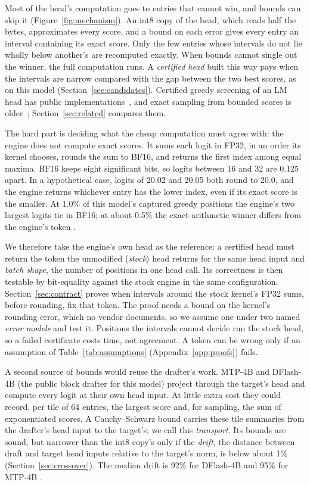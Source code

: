 Most of the head's computation goes to entries that cannot win, and bounds can skip it (Figure~\ref{fig:mechanism}). An int8 copy of the head, which reads half the bytes, approximates every score, and a bound on each error gives every entry an interval containing its exact score. Only the few entries whose intervals do not lie wholly below another's are recomputed exactly. When bounds cannot single out the winner, the full computation runs. A \emph{certified head} built this way pays when the intervals are narrow compared with the gap between the two best scores, as on this model (Section~\ref{sec:candidates}). Certified greedy screening of an LM head has public implementations~\cite{sparkpipehead,dgpphead,lagunaprune,knlphead}, and exact sampling from bounded scores is older~\cite{astar,mussmann2017}; Section~\ref{sec:related} compares them.

The hard part is deciding what the cheap computation must agree with: the engine does not compute exact scores. It sums each logit in FP32, in an order its kernel chooses, rounds the sum to BF16, and returns the first index among equal maxima. BF16 keeps eight significant bits, so logits between 16 and 32 are 0.125 apart. In a hypothetical case, logits of 20.02 and 20.05 both round to 20.0, and the engine returns whichever entry has the lower index, even if its exact score is the smaller. At 1.0\% of this model's captured greedy positions the engine's two largest logits tie in BF16; at about 0.5\% the exact-arithmetic winner differs from the engine's token .

We therefore take the engine's own head as the reference: a certified head must return the token the unmodified (\emph{stock}) head returns for the same head input and \emph{batch shape}, the number of positions in one head call. Its correctness is then testable by bit-equality against the stock engine in the same configuration. Section~\ref{sec:contract} proves when intervals around the stock kernel's FP32 sums, before rounding, fix that token. The proof needs a bound on the kernel's rounding error, which no vendor documents, so we assume one under two named \emph{error models} and test it. Positions the intervals cannot decide run the stock head, so a failed certificate costs time, not agreement. A token can be wrong only if an assumption of Table~\ref{tab:assumptions} (Appendix~\ref{app:proofs}) fails.

A second source of bounds would reuse the drafter's work. MTP-4B and DFlash-4B (the public block drafter for this model) project through the target's head and compute every logit at their own head input. At little extra cost they could record, per tile of 64 entries, the largest score and, for sampling, the sum of exponentiated scores. A Cauchy--Schwarz bound carries these tile summaries from the drafter's head input to the target's; we call this \emph{transport}. Its bounds are sound, but narrower than the int8 copy's only if the \emph{drift}, the distance between draft and target head inputs relative to the target's norm, is below about 1\% (Section~\ref{sec:crossover}). The median drift is 92\% for DFlash-4B and 95\% for MTP-4B .


